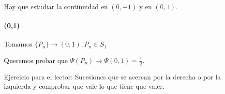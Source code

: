 Hay que estudiar la continuidad en $(0,-1)$ y en $(0,1)$.

\paragraph{(0,1)}

Tomamos $\{P_n\} \rightarrow (0,1), P_n \in S_1$

Queremos probar que $\Psi(P_n) \rightarrow \Psi(0,1) = \frac{\pi}{2}$.

Ejercicio para el lector: 
Sucesiones que se acercan por la derecha o por la izquierda y comprobar que vale lo que tiene que valer.		
